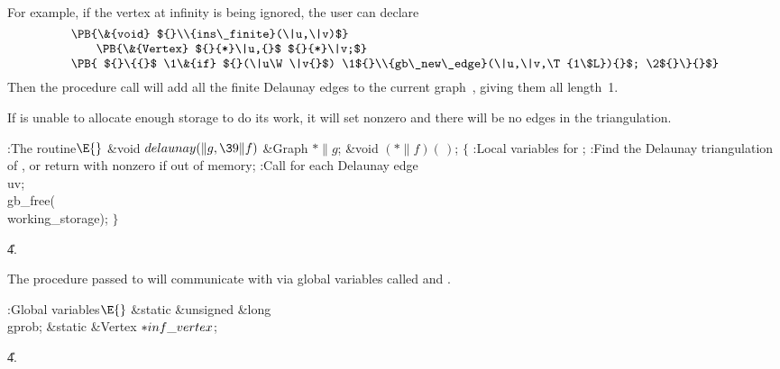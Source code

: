 For example, if the vertex at infinity is being ignored, the user can
declare
$$\vcenter{\halign{#\hfil\cr
\PB{\&{void} ${}\\{ins\_finite}(\|u,\|v)$}\cr
\qquad\PB{\&{Vertex} ${}{*}\|u,{}$ ${}{*}\|v;$}\cr
\PB{ ${}\{{}$ \1\&{if} ${}(\|u\W\|v{}$) \1${}\\{gb\_new\_edge}(\|u,\|v,\T{1%
\$L}){}$; \2${}\}{}$}\cr}}$$
Then the procedure call  will add all
the finite
Delaunay edges to the current graph~, giving them all length~1.

If  is unable to allocate enough storage to do its work, it
will set  nonzero and there will be no edges in
the triangulation.

\Y\B\4:The  routine\X${}\E{}$\6
\1\1\&{void} ${}\\{delaunay}(\|g,\39\|f){}$\6
\&{Graph} ${}{*}\|g{}$;\6
\&{void} ${}({*}\|f)(\,){}$;%
\2\2\6
${}\{{}$\5
\1:Local variables for \X;\7
:Find the Delaunay triangulation of , or return with  nonzero if out of memory\X;\6
:Call  for each Delaunay edge \\{uv}\X;\6
\\{gb\_free}(\\{working\_storage});\6
\4${}\}{}$\2\par
\U4.\fi

The procedure passed to  will communicate with  via
global variables called  and .

\Y\B\4:Global variables\X${}\E{}$\6
\&{static} \&{unsigned} \&{long} \\{gprob};\6
\&{static} \&{Vertex} ${}{*}\\{inf\_vertex}{}$;\par
\U4.\fi

